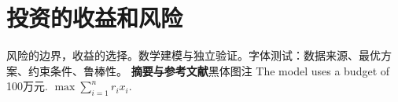 \documentclass[a4paper,12pt,fontset=fandol]{ctexart}
\begin{document}
\section{投资的收益和风险}
风险的边界，收益的选择。数学建模与独立验证。字体测试：数据来源、最优方案、约束条件、鲁棒性。
\textbf{摘要与参考文献}\quad\textsf{黑体图注}
The model uses a budget of 100万元. $\max \sum_{i=1}^n r_i x_i$.
\end{document}

